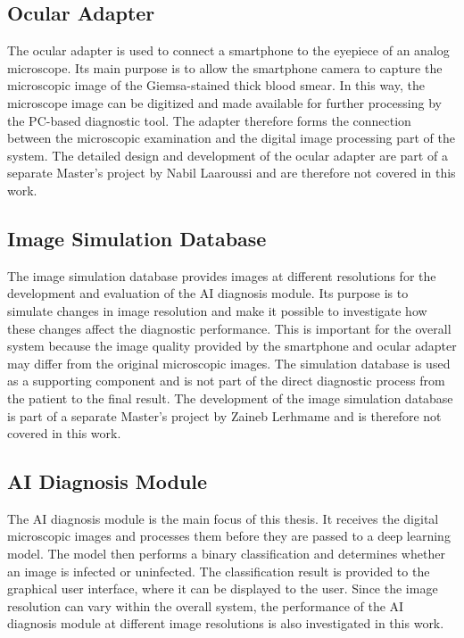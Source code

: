 \subsection{Ocular Adapter}

The ocular adapter is used to connect a smartphone to the eyepiece of an analog microscope. Its main purpose is to allow the smartphone camera to capture the microscopic image of the Giemsa-stained thick blood smear. In this way, the microscope image can be digitized and made available for further processing by the PC-based diagnostic tool. The adapter therefore forms the connection between the microscopic examination and the digital image processing part of the system. The detailed design and development of the ocular adapter are part of a separate Master's project by Nabil Laaroussi and are therefore not covered in this work.

\subsection{Image Simulation Database}

The image simulation database provides images at different resolutions for the development and evaluation of the AI diagnosis module. Its purpose is to simulate changes in image resolution and make it possible to investigate how these changes affect the diagnostic performance. This is important for the overall system because the image quality provided by the smartphone and ocular adapter may differ from the original microscopic images. The simulation database is used as a supporting component and is not part of the direct diagnostic process from the patient to the final result. The development of the image simulation database is part of a separate Master's project by Zaineb Lerhmame and is therefore not covered in this work.
\subsection{AI Diagnosis Module}

The AI diagnosis module is the main focus of this thesis. It receives the digital microscopic images and processes them before they are passed to a deep learning model. The model then performs a binary classification and determines whether an image is infected or uninfected. The classification result is provided to the graphical user interface, where it can be displayed to the user. Since the image resolution can vary within the overall system, the performance of the AI diagnosis module at different image resolutions is also investigated in this work.

